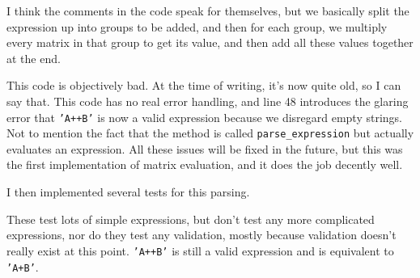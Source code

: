 \documentclass[../main.tex]{subfiles}
\begin{document}

I think the comments in the code speak for themselves, but we basically split the expression up into groups to be added, and then for each group, we multiply every matrix in that group to get its value, and then add all these values together at the end.

This code is objectively bad. At the time of writing, it's now quite old, so I can say that. This code has no real error handling, and line 48 introduces the glaring error that \texttt{'A++B'} is now a valid expression because we disregard empty strings. Not to mention the fact that the method is called \texttt{parse\_expression} but actually evaluates an expression. All these issues will be fixed in the future, but this was the first implementation of matrix evaluation, and it does the job decently well.

I then implemented several tests for this parsing.


These test lots of simple expressions, but don't test any more complicated expressions, nor do they test any validation, mostly because validation doesn't really exist at this point. \texttt{'A++B'} is still a valid expression and is equivalent to \texttt{'A+B'}.
\end{document}
